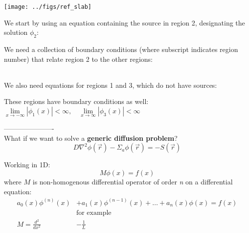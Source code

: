 \documentclass[12pt]{article}
\newif\ifeqns
\newcommand{\rvec}{\ensuremath{\vec{r}}}
\begin{document}
\begin{center}
\texttt{[image: ../figs/ref\_slab]}
\end{center}

We start by using an equation containing the source in region 2, designating the solution $\phi_2$:
\ifeqns
\begin{equation*}
\frac{d^2\phi_2(x)}{dx_2^2} - \frac{1}{L_2^2}\phi_2(x) = -\frac{S_0}{D_2}, \quad -\tfrac{a}{2}<x<\tfrac{a}{2}
\end{equation*}
\else
\vspace*{3em}
\fi

We need a collection of boundary conditions (where subscript indicates region number) that relate region 2 to the other regions:
\ifeqns
\begin{gather*}
\phi_2(\tfrac{a}{2}) = \phi_3(\tfrac{a}{2}) \\
\vec{J}_2(\tfrac{a}{2}) = \vec{J}_3(\tfrac{a}{2}) \\
\phi_1(-\tfrac{a}{2}) = \phi_2(-\tfrac{a}{2}) \\
\vec{J}_1(-\tfrac{a}{2}) = \vec{J}_2(-\tfrac{a}{2}) 
\end{gather*}
\else
\vspace*{12em}\\
\fi
We also need equations for regions 1 and 3, which do not have sources:
\ifeqns
\begin{align*}
\frac{d^2\phi_1(x)}{dx_1^2} &- \frac{1}{L_1^2}\phi_1(x) = 0, \quad -\infty<x<-\tfrac{a}{2}\\
%
\frac{d^2\phi_3(x)}{dx_3^2} &- \frac{1}{L_3^2}\phi_3(x) = 0, \quad \tfrac{a}{2}<x<\infty
\end{align*}
\else
\vspace*{8em}
\fi

These regions have boundary conditions as well: 
$\lim\limits_{x\to-\infty}|\phi_1(x)| <\infty, \quad \lim\limits_{x\to\infty}|\phi_3(x)| < \infty$

----------------------\\
What if we want to solve a \textbf{generic diffusion problem}?
%
\begin{equation*}
D\nabla^2\phi(\rvec) - \Sigma_a\phi(\rvec) = -S(\rvec)
\end{equation*}

Working in 1D:
\begin{equation*}
M\phi(x) = f(x)
\end{equation*}
%
where $M$ is non-homogenous differential operator of order \emph{n} on a differential equation:
%
\begin{align*}
a_0(x)\phi^{(n)}(x) &+ a_1(x)\phi^{(n-1)}(x) + \dotsc + a_n(x)\phi(x) = f(x)\\
&\text{for example}\\
M = \frac{d^2}{dx^2} &- \frac{1}{L}
\end{align*}
\end{document}
